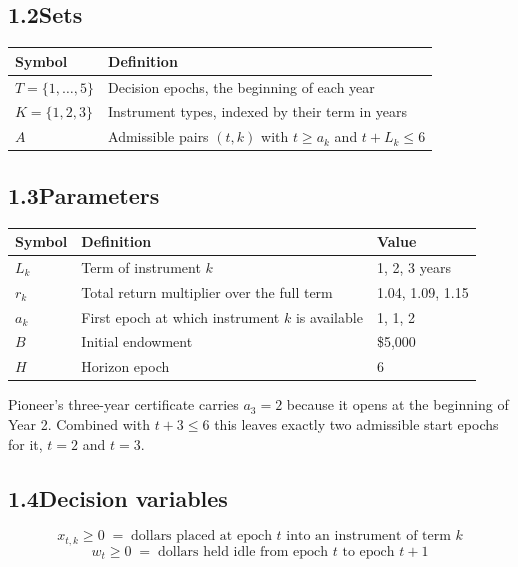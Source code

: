 \documentclass[11pt]{article}
\begin{document}
\subsection*{1.2\quad Sets}

\begin{center}
\begin{tabular}{@{}ll@{}}
\toprule
Symbol & Definition \\
\midrule
$T = \{1,\dots,5\}$ & Decision epochs, the beginning of each year \\
$K = \{1,2,3\}$     & Instrument types, indexed by their term in years \\
$A$                 & Admissible pairs $(t,k)$ with $t \ge a_k$ and $t + L_k \le 6$ \\
\bottomrule
\end{tabular}
\end{center}

\subsection*{1.3\quad Parameters}

\begin{center}
\begin{tabular}{@{}lll@{}}
\toprule
Symbol & Definition & Value \\
\midrule
$L_k$ & Term of instrument $k$                        & 1, 2, 3 years \\
$r_k$ & Total return multiplier over the full term    & 1.04, 1.09, 1.15 \\
$a_k$ & First epoch at which instrument $k$ is available & 1, 1, 2 \\
$B$   & Initial endowment                             & \$5,000 \\
$H$   & Horizon epoch                                 & 6 \\
\bottomrule
\end{tabular}
\end{center}

Pioneer's three-year certificate carries $a_3 = 2$ because it opens at
the beginning of Year 2. Combined with $t + 3 \le 6$ this leaves exactly
two admissible start epochs for it, $t = 2$ and $t = 3$.

\subsection*{1.4\quad Decision variables}

\[
  x_{t,k} \ge 0 \;=\; \text{dollars placed at epoch } t
  \text{ into an instrument of term } k
\]
\[
  w_t \ge 0 \;=\; \text{dollars held idle from epoch } t
  \text{ to epoch } t+1
\]
\end{document}
